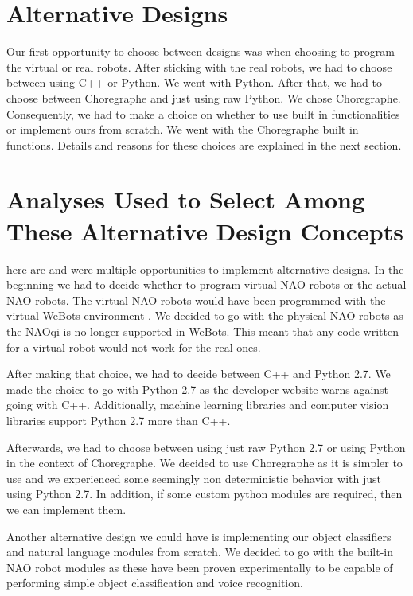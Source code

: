 \section{Alternative Designs}
Our first opportunity to choose between designs was when choosing to program the virtual or real robots. After sticking with the real robots, we had to choose between using C++ or Python. We went with Python. After that, we had to choose between Choregraphe and just using raw Python. We chose Choregraphe. Consequently, we had to make a choice on whether to use built in functionalities or implement ours from scratch. We went with the Choregraphe built in functions. Details and reasons for these choices are explained in the next section. \par
\section{Analyses Used to Select Among These Alternative Design Concepts}
here are and were multiple opportunities to implement alternative designs. In the beginning we had to decide whether to program virtual NAO robots or the actual NAO robots. The virtual NAO robots would have been programmed with the virtual WeBots environment \cite{webots}. We decided to go with the physical NAO robots as the NAOqi is no longer supported in WeBots. This meant that any code written for a virtual robot would not work for the real ones. \par 

After making that choice, we had to decide between C++ and Python 2.7.  We made the choice to go with Python 2.7 as the developer website warns against going with C++. Additionally, machine learning libraries and computer vision libraries support Python 2.7 more than C++.  \par 

Afterwards, we had to choose between using just raw Python 2.7 or using Python in the context of Choregraphe. We decided to use Choregraphe as it is simpler to use and we experienced some seemingly non deterministic behavior with just using Python 2.7. In addition, if some custom python modules are required, then we can implement them. \par 

Another alternative design we could have is implementing our object classifiers and natural language modules from scratch. We decided to go with the built-in NAO robot modules as these have been proven experimentally to be capable of performing simple object classification and voice recognition. \par

